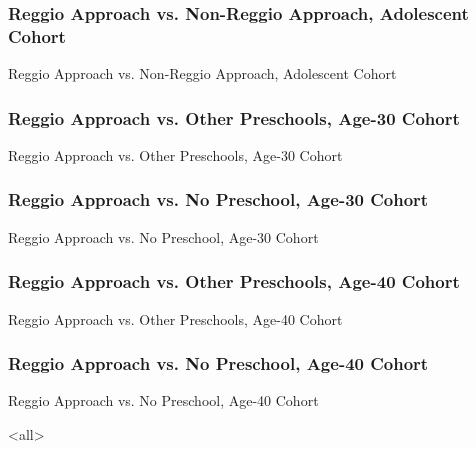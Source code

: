 \documentclass[static]{JJH-Beamer_PAGENOS}
\begin{document}
\begin{frame}
\frametitle{Reggio Approach vs. Non-Reggio Approach, Adolescent Cohort}
\centering
\begin{table}[H]
\caption{Reggio Approach vs. Non-Reggio Approach, Adolescent Cohort}
\end{table}
\end{frame}

\begin{frame}
\frametitle{Reggio Approach vs. Other Preschools, Age-30 Cohort}
\centering
\begin{table}[H]
\caption{Reggio Approach vs. Other Preschools, Age-30 Cohort}
\end{table}
\end{frame}

\begin{frame}
\frametitle{Reggio Approach vs. No Preschool, Age-30 Cohort}
\centering
\begin{table}[H]
\caption{Reggio Approach vs. No Preschool, Age-30 Cohort}
\end{table}
\end{frame}

\begin{frame}
\frametitle{Reggio Approach vs. Other Preschools, Age-40 Cohort}
\centering
\begin{table}[H]
\caption{Reggio Approach vs. Other Preschools, Age-40 Cohort}
\end{table}
\end{frame}

\begin{frame}
\frametitle{Reggio Approach vs. No Preschool, Age-40 Cohort}
\centering
\begin{table}[H]
\caption{Reggio Approach vs. No Preschool, Age-40 Cohort}
\end{table}
\end{frame}



\mode<all>

\savebox\hiddenbib{\parbox{\textwidth}{}}
\end{document}
